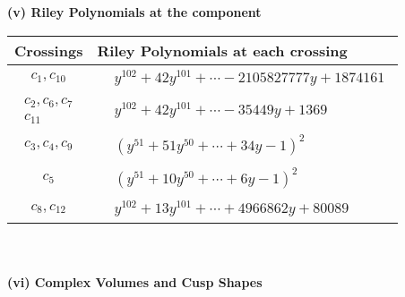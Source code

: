 \documentclass[1p]{elsarticle_modified}
\theoremstyle{definition}
\begin{document}
\newpage\renewcommand{\arraystretch}{1}
\flushleft \textbf{(v) Riley Polynomials at the component}\newline \\
\begin{tabular}{m{50pt}|m{274pt}}
Crossings & \hspace{64pt}Riley Polynomials at each crossing \\
\hline $$\begin{aligned}c_{1},c_{10}\end{aligned}$$&$\begin{aligned}
&y^{102}+42 y^{101}+\cdots-2105827777 y+1874161
\end{aligned}$\\
\hline $$\begin{aligned}c_{2},c_{6},c_{7}\\c_{11}\end{aligned}$$&$\begin{aligned}
&y^{102}+42 y^{101}+\cdots-35449 y+1369
\end{aligned}$\\
\hline $$\begin{aligned}c_{3},c_{4},c_{9}\end{aligned}$$&$\begin{aligned}
&(y^{51}+51 y^{50}+\cdots+34 y-1)^{2}
\end{aligned}$\\
\hline $$\begin{aligned}c_{5}\end{aligned}$$&$\begin{aligned}
&(y^{51}+10 y^{50}+\cdots+6 y-1)^{2}
\end{aligned}$\\
\hline $$\begin{aligned}c_{8},c_{12}\end{aligned}$$&$\begin{aligned}
&y^{102}+13 y^{101}+\cdots+4966862 y+80089
\end{aligned}$\\
\hline
\end{tabular}\\~\\
\newpage\flushleft \textbf{(vi) Complex Volumes and Cusp Shapes}
\end{document}
